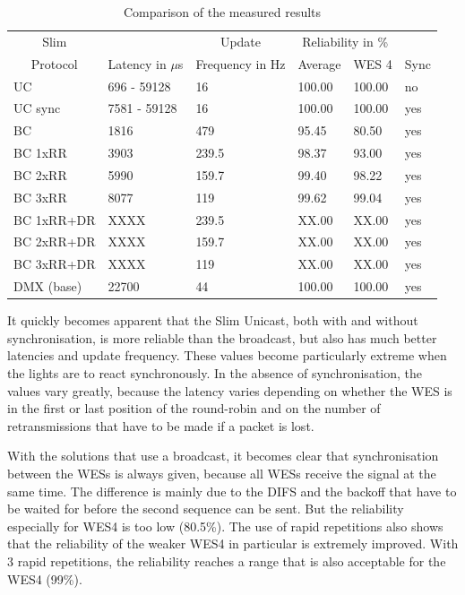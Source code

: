 \begin{table}[h]
	\centering
	\begin{tabular} { llllll }
	\toprule
	\multicolumn{1}{c}{Slim}
	& \multicolumn{1}{c}{}
	& \multicolumn{1}{c}{Update}
	& \multicolumn{2}{c}{Reliability in \%} 
	& \multicolumn{1}{c}{} \\

	\multicolumn{1}{c}{Protocol}
	& \multicolumn{1}{c}{Latency in $\mu$s}
	& \multicolumn{1}{c}{Frequency in Hz}
	& \multicolumn{1}{c}{Average}
	& \multicolumn{1}{c}{WES 4}
	& \multicolumn{1}{c}{Sync} \\

	\midrule
	UC        & 696 - 59128 & 16        & 100.00 & 100.00 & no \\
	UC sync   &7581 - 59128 & 16        & 100.00 & 100.00 & yes \\
	BC        & 1816        & 479       & 95.45  & 80.50  & yes \\
	BC 1xRR   & 3903        & 239.5     & 98.37  & 93.00  & yes \\
	BC 2xRR   & 5990        & 159.7     & 99.40  & 98.22  & yes \\
	BC 3xRR   & 8077        & 119       & 99.62  & 99.04  & yes \\
	BC 1xRR+DR& XXXX        & 239.5     & XX.00  & XX.00  & yes \\
	BC 2xRR+DR& XXXX        & 159.7     & XX.00  & XX.00  & yes \\
	BC 3xRR+DR& XXXX        & 119       & XX.00  & XX.00  & yes \\
	DMX (base)& 22700       & 44        & 100.00 & 100.00 & yes \\
	\bottomrule
	\end{tabular}
	\caption{Comparison of the measured results}
	\label{tab:results}
\end{table}

It quickly becomes apparent that the Slim Unicast, both with and without synchronisation, 
is more reliable than the broadcast, but also has much better latencies and update frequency.
These values become particularly extreme when the lights are to react synchronously.
In the absence of synchronisation, the values vary greatly, 
because the latency varies depending on whether the WES is in the first or last position of the round-robin
and on the number of retransmissions that have to be made if a packet is lost.

With the solutions that use a broadcast, it becomes clear that synchronisation between the WESs is always given,
because all WESs receive the signal at the same time.
The difference is mainly due to the DIFS and the backoff that have to be waited for before the second sequence can be sent.
But the reliability especially for WES4 is too low (80.5\%).
The use of rapid repetitions also shows that the reliability of the weaker WES4 in particular is extremely improved.
With 3 rapid repetitions, the reliability reaches a range that is also acceptable for the WES4 (99\%).

